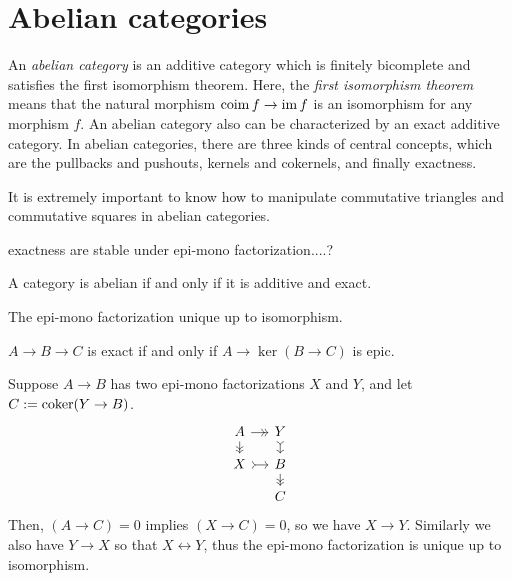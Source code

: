 \documentclass{../../large}
\begin{document}
\section{Abelian categories}

\begin{prb}
An \emph{abelian category} is an additive category which is finitely bicomplete and satisfies the first isomorphism theorem.
Here, the \emph{first isomorphism theorem} means that the natural morphism $\operatorname{coim} f\to\operatorname{im} f$ is an isomorphism for any morphism $f$.
An abelian category also can be characterized by an exact additive category.
In abelian categories, there are three kinds of central concepts, which are the pullbacks and pushouts, kernels and cokernels, and finally exactness.

It is extremely important to know how to manipulate commutative triangles and commutative squares in abelian categories.

exactness are stable under epi-mono factorization....?


\begin{parts}
\item A category is abelian if and only if it is additive and exact.
\item The epi-mono factorization unique up to isomorphism.
\item $A\to B\to C$ is exact if and only if $A\to\ker(B\to C)$ is epic.
\end{parts}
\end{prb}
\begin{pf}

Suppose $A\to B$ has two epi-mono factorizations $X$ and $Y$, and let $C:=\operatorname{coker}(Y\to B)$.
\[\begin{tikzcd}[sep=small]
A \rar[->>]\dar[->>] & Y \dar[>->] \\
X \rar[>->] & B \dar[->>]\\
& C
\end{tikzcd}\]
Then, $(A\to C)=0$ implies $(X\to C)=0$, so we have $X\to Y$.
Similarly we also have $Y\to X$ so that $X\leftrightarrow Y$, thus the epi-mono factorization is unique up to isomorphism.
\end{pf}
\end{document}
